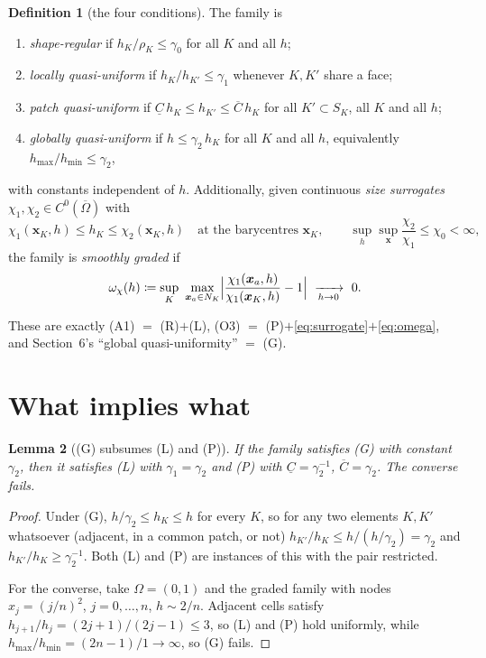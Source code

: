 \documentclass[11pt,a4paper]{article}
\newtheorem{lemma}{Lemma}
\theoremstyle{definition}
\newtheorem{definition}[lemma]{Definition}
\newcommand{\bx}{\boldsymbol{x}}
\begin{document}
\begin{definition}[the four conditions]\label{def:four}
The family is
\begin{enumerate}
\item[(R)] \emph{shape-regular} if $h_K/\rho_K\le\gamma_0$ for all $K$ and all $h$;
\item[(L)] \emph{locally quasi-uniform} if $h_K/h_{K'}\le\gamma_1$ whenever $K,K'$ share a face;
\item[(P)] \emph{patch quasi-uniform} if $\underline C\,h_K\le h_{K'}\le\overline C\,h_K$ for all
      $K'\subset S_K$, all $K$ and all $h$;
\item[(G)] \emph{globally quasi-uniform} if $h\le\gamma_2\,h_K$ for all $K$ and all $h$,
      equivalently $h_{\max}/h_{\min}\le\gamma_2$,
\end{enumerate}
with constants independent of $h$. Additionally, given continuous \emph{size surrogates}
$\chi_1,\chi_2\in C^0(\overline\Omega)$ with
\begin{equation}\label{eq:surrogate}
  \chi_1(\bx_K,h)\le h_K\le\chi_2(\bx_K,h)\quad\text{at the barycentres }\bx_K,
  \qquad \sup_h\sup_{\bx}\frac{\chi_2}{\chi_1}\le\chi_0<\infty,
\end{equation}
the family is \emph{smoothly graded} if
\begin{equation}\label{eq:omega}
  \omega_\chi(h)\coloneqq\sup_{K}\ \max_{\bx_a\in N_K}
  \Bigl|\frac{\chi_1(\bx_a,h)}{\chi_1(\bx_K,h)}-1\Bigr|\ \xrightarrow[h\to0]{}\ 0 .
\end{equation}
\end{definition}

These are exactly (A1) $=$ (R)$+$(L), (O3) $=$ (P)$+$\eqref{eq:surrogate}$+$\eqref{eq:omega}, and
Section~6's ``global quasi-uniformity'' $=$ (G).

\section{What implies what}

\begin{lemma}[(G) subsumes (L) and (P)]\label{lem:implications}
If the family satisfies (G) with constant $\gamma_2$, then it satisfies (L) with $\gamma_1=\gamma_2$
and (P) with $\underline C=\gamma_2^{-1}$, $\overline C=\gamma_2$. The converse fails.
\end{lemma}

\begin{proof}
Under (G), $h/\gamma_2\le h_K\le h$ for every $K$, so for any two elements $K,K'$ whatsoever
(adjacent, in a common patch, or not) $h_{K'}/h_K\le h/(h/\gamma_2)=\gamma_2$ and
$h_{K'}/h_K\ge\gamma_2^{-1}$. Both (L) and (P) are instances of this with the pair restricted.

For the converse, take $\Omega=(0,1)$ and the graded family with nodes $x_j=(j/n)^2$,
$j=0,\dots,n$, $h\sim 2/n$. Adjacent cells satisfy
$h_{j+1}/h_j=(2j+1)/(2j-1)\le3$, so (L) and (P) hold uniformly, while
$h_{\max}/h_{\min}=(2n-1)/1\to\infty$, so (G) fails.
\end{proof}
\end{document}
